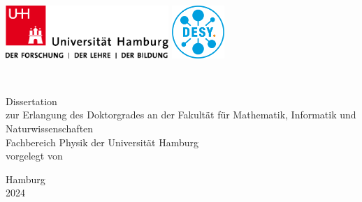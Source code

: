 
\begin{titlepage}
    \begin{addmargin}[-1cm]{-3cm}
	    \begin{center}
	        
	        \includegraphics[height=2cm]{logos/Uhh}
	        \hfill
	        \hfill 
	        \includegraphics[height=2cm]{logos/DESY_logo}
	
	        \hfill
	        \vfill
			
	        \begingroup
	        	\Huge
	        	\color{DESYcyan} 
	            \\
	        \endgroup
	        
	        \vspace{2.5cm}
	        \Large
	        {Dissertation}\\
	        \vspace{0.5cm}
	        {zur Erlangung des Doktorgrades an der Fakultät für Mathematik, Informatik und Naturwissenschaften}\\
			\vspace{0.5cm}
	        {Fachbereich Physik der Universität Hamburg}\\
	        \vspace{0.5cm}
	        {vorgelegt von}\\
	        \vspace{1.5cm}
	        \Large
	        \Large
	
	        \vfill
	        {Hamburg}\\
	        {2024}\\
	        
	        \vfill


    	\end{center}
	\end{addmargin}
\end{titlepage}

